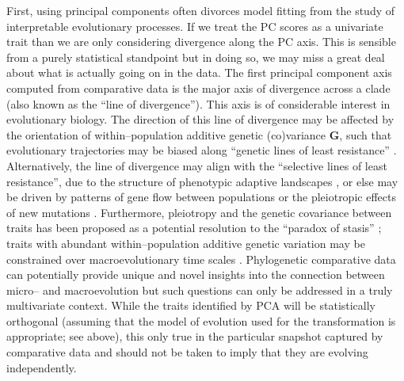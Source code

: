 \documentclass[a4paper,12pt]{article}
\begin{document}
First, using principal components often divorces model fitting from the study of interpretable evolutionary processes. If we treat the PC scores as a univariate trait than we are only considering divergence along the PC axis. This is sensible from a purely statistical standpoint but in doing so, we may miss a great deal about what is actually going on in the data. The first principal component axis computed from comparative data is the major axis of divergence across a clade (also known as the ``line of divergence''). This axis is of considerable interest in evolutionary biology. The direction of this line of divergence may be affected by the orientation of within--population additive genetic (co)variance $\mathbf{G}$, such that evolutionary trajectories may be biased along ``genetic lines of least resistance'' \citep[i.e., divergence occurs primarily along the leading eigenvector of $\mathbf{G}$, $G_{\text{max}}$;][]{Schluter1996, Arnoldetal2001}. Alternatively, the line of divergence may align with the ``selective lines of least resistance'', due to the structure of phenotypic adaptive landscapes \citep{Arnold2003, Jonesetal2007, Arnoldetal2008}, or else may be driven by patterns of gene flow between populations \citep{Guillaume2007} or the pleiotropic effects of new mutations \citep{Jonesetal2007, Hether2013, Houle2013}. Furthermore, pleiotropy and the genetic covariance between traits has been proposed as a potential resolution to the ``paradox of stasis'' \citep{HansenHoule2004}; traits with abundant within--population additive genetic variation may be constrained over macroevolutionary time scales \citep{Kirkpatrick2009, WalshBlows2009}. Phylogenetic comparative data can potentially provide unique and novel insights into the connection between micro-- and macroevolution \citep{Hohenlohe2008} but such questions can only be addressed in a truly multivariate context. While the traits identified by PCA will be statistically orthogonal (assuming that the model of evolution used for the transformation is appropriate; see above), this only true in the particular snapshot captured by comparative data and should not be taken to imply that they are evolving independently. 
\end{document}
